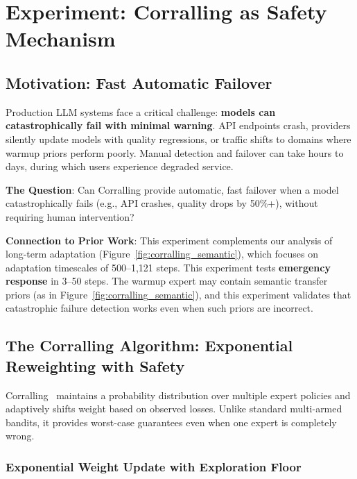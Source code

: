 
\section{Experiment: Corralling as Safety Mechanism}
\label{sec:corralling}

\subsection{Motivation: Fast Automatic Failover}

Production LLM systems face a critical challenge: \textbf{models can catastrophically fail with minimal warning}. API endpoints crash, providers silently update models with quality regressions, or traffic shifts to domains where warmup priors perform poorly. Manual detection and failover can take hours to days, during which users experience degraded service.

\textbf{The Question}: Can Corralling provide automatic, fast failover when a model catastrophically fails (e.g., API crashes, quality drops by 50\%+), without requiring human intervention?

\textbf{Connection to Prior Work}: This experiment complements our analysis of long-term adaptation (Figure~\ref{fig:corralling_semantic}), which focuses on adaptation timescales of 500--1,121 steps. This experiment tests \textbf{emergency response} in 3--50 steps. The warmup expert may contain semantic transfer priors (as in Figure~\ref{fig:corralling_semantic}), and this experiment validates that catastrophic failure detection works even when such priors are incorrect.

\subsection{The Corralling Algorithm: Exponential Reweighting with Safety}

Corralling~\cite{agarwal2017corralling} maintains a probability distribution over multiple expert policies and adaptively shifts weight based on observed losses. Unlike standard multi-armed bandits, it provides worst-case guarantees even when one expert is completely wrong.

\subsubsection{Exponential Weight Update with Exploration Floor}

